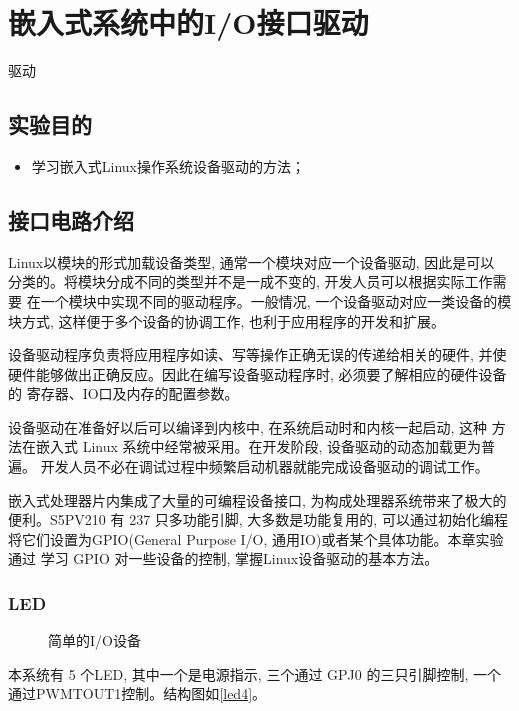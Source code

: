 \chapter{嵌入式系统中的I/O接口驱动}{驱动}

\section{实验目的}
\begin{itemize}
  \item 学习嵌入式Linux操作系统设备驱动的方法；
\end{itemize}

\section{接口电路介绍}
Linux以模块的形式加载设备类型, 通常一个模块对应一个设备驱动, 因此是可以
分类的。将模块分成不同的类型并不是一成不变的, 开发人员可以根据实际工作需要
在一个模块中实现不同的驱动程序。一般情况, 一个设备驱动对应一类设备的模块方式, 
这样便于多个设备的协调工作, 也利于应用程序的开发和扩展。

设备驱动程序负责将应用程序如读、写等操作正确无误的传递给相关的硬件, 并使
硬件能够做出正确反应。因此在编写设备驱动程序时, 必须要了解相应的硬件设备的
寄存器、IO口及内存的配置参数。

设备驱动在准备好以后可以编译到内核中, 在系统启动时和内核一起启动, 这种
方法在嵌入式 Linux 系统中经常被采用。在开发阶段, 设备驱动的动态加载更为普遍。
开发人员不必在调试过程中频繁启动机器就能完成设备驱动的调试工作。

嵌入式处理器片内集成了大量的可编程设备接口, 为构成处理器系统带来了极大的
便利。S5PV210 有 237 只多功能引脚, 大多数是功能复用的, 可以通过初始化编程
将它们设置为GPIO(General Purpose I/O, 通用IO)或者某个具体功能。本章实验通过
学习 GPIO 对一些设备的控制, 掌握Linux设备驱动的基本方法。

\subsection{LED}
\begin{figure}[!ht]
\centering
{}\hspace{5mm}
\caption{简单的I/O设备}\label{simple_IO}
\end{figure}

本系统有 5 个LED, 其中一个是电源指示, 三个通过 GPJ0 的三只引脚控制,
一个通过PWMTOUT1控制。结构图如\ref{led4}。

